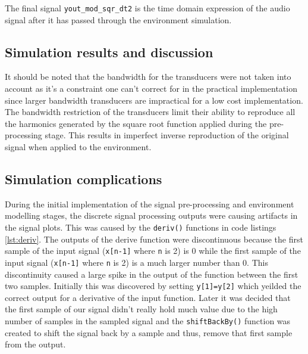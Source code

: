 The final signal \texttt{yout\_mod\_sqr\_dt2} is the time domain expression of the audio signal after it has passed through the environment simulation.

\subsection{Simulation results and discussion}
It should be noted that the bandwidth for the transducers were not taken into account as it's a constraint one can't correct for in the practical implementation since larger bandwidth transducers are impractical for a low cost implementation. The bandwidth restriction of the transducers limit their ability to reproduce all the harmonics generated by the square root function applied during the pre-processing stage. This results in imperfect inverse reproduction of the original signal when applied to the environment.

\subsection{Simulation complications}
During the initial implementation of the signal pre-processing and environment modelling stages, the discrete signal processing outputs were causing artifacts in the signal plots. This was caused by the \texttt{deriv()} functions in code listings \ref{lst:deriv}. The outputs of the derive function were discontinuous because the first sample of the input signal (\texttt{x[n-1]} where \texttt{n} is 2) is 0 while the first sample of the input signal (\texttt{x[n-1]} where \texttt{n} is 2) is a much larger number than 0. This discontinuity caused a large spike in the output of the function between the first two samples. Initially this was discovered by setting \texttt{y[1]=y[2]} which yeilded the correct output for a derivative of the input function. Later it was decided that the first sample of our signal didn't really hold much value due to the high number of samples in the sampled signal and the \texttt{shiftBackBy()} function was created to shift the signal back by a sample and thus, remove that first sample from the output.
